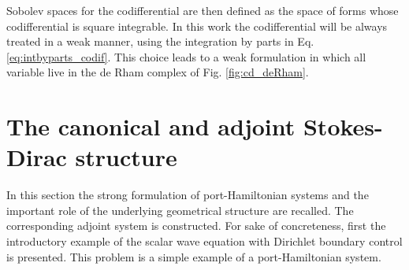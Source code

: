 \documentclass{elsarticle}
\newcommand{\revTwo}[1]{{\color{black}#1}}
\begin{document}
\revTwo{Sobolev spaces for the codifferential are then defined as the space of forms whose codifferential is square integrable. In this work the codifferential will be always treated in a weak manner, using the integration by parts in Eq. \eqref{eq:intbyparts_codif}. This choice leads to a weak formulation in which all variable live in the de Rham complex of Fig. \ref{fig:cd_deRham}}.


\section{The \revTwo{canonical} and adjoint Stokes-Dirac structure}\label{sec:pradj_SDS}
In this section the strong formulation of port-Hamiltonian systems and the important role of the underlying geometrical structure are recalled. The corresponding adjoint system is constructed. \revTwo{For sake of concreteness, first the introductory example of the scalar wave equation with Dirichlet boundary control is presented. This problem is a simple example of a port-Hamiltonian system.
}
\end{document}
